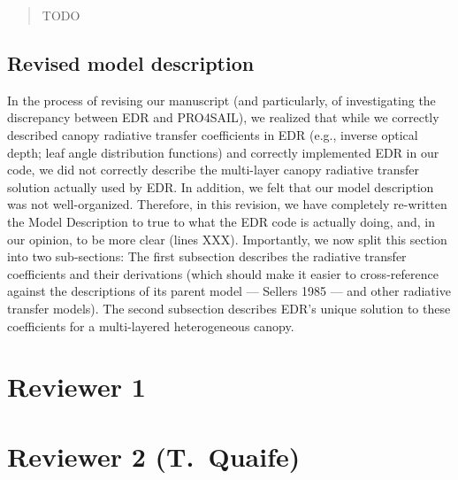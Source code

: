 \documentclass{article}
\begin{document}
\begin{quote}

  TODO

\end{quote}

\subsection{Revised model description}\label{subsec:model}

In the process of revising our manuscript (and particularly, of investigating the discrepancy between EDR and PRO4SAIL), we realized that while we correctly described canopy radiative transfer coefficients in EDR (e.g., inverse optical depth; leaf angle distribution functions) and correctly implemented EDR in our code,
we did not correctly describe the multi-layer canopy radiative transfer solution actually used by EDR.\@
In addition, we felt that our model description was not well-organized.
Therefore, in this revision, we have completely re-written the Model Description to true to what the EDR code is actually doing, and, in our opinion, to be more clear (lines XXX).
Importantly, we now split this section into two sub-sections:
The first subsection describes the radiative transfer coefficients and their derivations (which should make it easier to cross-reference against the descriptions of its parent model --- Sellers 1985 --- and other radiative transfer models).
The second subsection describes EDR's unique solution to these coefficients for a multi-layered heterogeneous canopy.

\section{Reviewer 1}\label{sec:r1}



\section{Reviewer 2 (T.\ Quaife)}\label{sec:r2}




\end{document}
